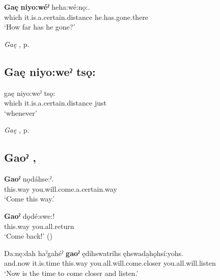 \ea
\label{ex:gpart28}
\gll \textbf{Gaę} \textbf{niyo:wéˀ} heha:wé:nǫ:.\\
which it.is.a.certain.distance he.has.gone.there\\
\glt ‘How far has he gone?’
\z

\begin{CayugaRelated}
\item \textit{Gaę} , p. \pageref{p:[gaę-]}
\end{CayugaRelated}

\subsection*{\textbf{Gaę niyo:weˀ tsǫ:} } \label{p:[gaę niyo:weˀ tsǫ:]}

\ea
\label{ex:gpart285}
\gll gaę niyo:weˀ tsǫ:\\
which it.is.a.certain.distance just\\
\glt ‘whenever’
\z


\begin{CayugaRelated}
\item \textit{Gaę} , p. \pageref{p:[gaę-]}
\end{CayugaRelated}

\subsection*{\textbf{Gaoˀ} , } \label{p:[gaoˀ]}

\ea
\label{ex:gpart30}
\gll \textbf{Gaoˀ} nǫdáhse:ˀ.\\
this.way you.will.come.a.certain.way\\
\glt ‘Come this way.’
\z

\ea
\label{ex:gpart31}
\gll \textbf{Gaoˀ} dǫdé:swe:!\\
this.way you.all.return\\
\glt ‘Come back!’ (\cite{carrier_legends_2013})
\z

\ea
\label{ex:gpart32}
\gll Da:nę:dah haˀgahéˀ \textbf{gaoˀ} ędihswatríhs ęhswada̱hǫhsí:yohs.\\
and.now it.is.time this.way you.all.will.come.closer you.all.will.listen\\
\glt ‘Now is the time to come closer and listen.’
\z

